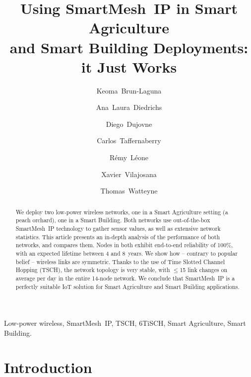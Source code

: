 \documentclass{elsarticle}
\newcommand{\smip}                {SmartMesh~IP\xspace}
\newcommand{\building}            {Smart Building\xspace}
\newcommand{\agri}                {Smart Agriculture\xspace}
\begin{document}
\begin{frontmatter}

\date{}

\title{Using \smip in \agri \\ and \building Deployments: it Just Works}

\author[inria]{Keoma~Brun-Laguna}
\author[utn]{Ana~Laura~Diedrichs}
\author[udp]{Diego~Dujovne}
\author[utn]{Carlos~Taffernaberry}
\author[inria]{R\'emy~L\'eone}
\author[uoc]{Xavier~Vilajosana}
\author[inria]{Thomas~Watteyne}

\address[inria]{~Inria, EVA team, Paris, France}
\address[utn]{~Universidad Tecnol\'ogica Nacional (UTN), Mendoza, Argentina}
\address[udp]{~Universidad Diego Portales, Santiago, Chile}
\address[uoc]{~Universitat Oberta de Catalunya, Barcelona, Catalonia, Spain}

\begin{abstract}
We deploy two low-power wireless networks, one in a \agri setting (a peach orchard), one in a \building.
Both networks use out-of-the-box \smip technology to gather sensor values, as well as extensive network statistics.
This article presents an in-depth analysis of the performance of both networks, and compares them.
Nodes in both exhibit end-to-end reliability of 100\%, with an expected lifetime between 4 and 8~years.
We show how -- contrary to popular belief -- wireless links are symmetric.
Thanks to the use of Time Slotted Channel Hopping (TSCH), the network topology is very stable, with $\leq$15 link changes on average per day in the entire 14-node network.
We conclude that \smip is a perfectly suitable IoT solution for \agri and \building applications.
\end{abstract}

\begin{keyword}
Low-power wireless, \smip, TSCH, 6TiSCH, \agri, \building.
\end{keyword}

\end{frontmatter}

\section{Introduction}
\label{sec:intro}
\end{document}
